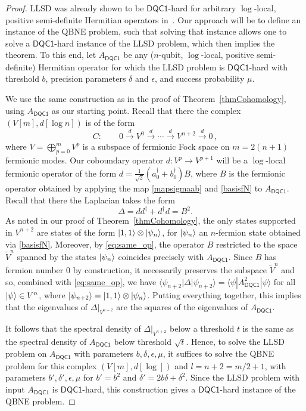 \documentclass[11pt]{article}
\numberwithin{equation}{section}
\newcommand{\DQC}{\mathsf{DQC1}}
\newcommand\equ[1] {\begin{equation}#1\end{equation}}
\renewcommand\( {\left(}
\renewcommand\) {\right)}
\renewcommand{\braket}[1]{\langle #1 \rangle}
\begin{document}
\begin{proof}
	{\sc LLSD} was already shown to be $\DQC$-hard for arbitrary $\log$-local, positive semi-definite Hermitian operators in~\cite{gyurik}. Our approach will be to define an instance of the {\sc QBNE} problem, such that solving that instance allows one to solve a $\DQC$-hard instance of the {\sc LLSD} problem, which then implies the theorem. To this end, let $A_{\DQC}$ be any ($n$-qubit, $\log$-local, positive semi-definite) Hermitian operator for which the {\sc LLSD} problem is $\DQC$-hard with threshold $b$, precision parameters $\delta$ and $\epsilon$, and success probability $\mu$. 
	
	We use the same construction as in the proof of Theorem~\ref{thmCohomology}, using $A_{\DQC}$ as our starting point. Recall that there the complex $(V[m], d[\log n])$ is of the form
	\[
	    C:\qquad 0\xrightarrow{d} V^{0}\xrightarrow{d} \cdots \xrightarrow{d} V^{n+2}\xrightarrow{d} 0\,,
	\]
	where $V = \bigoplus_{p=0}^{m} V^p$ is a subspace of fermionic Fock space on $m=2(n+1)$ fermionic modes. Our coboundary operator $d : V^p \rightarrow V^{p+1}$ will be a $\log$-local fermionic operator of the form $d = \frac{1}{\sqrt{2}}(a_0^\dagger + b_0^\dagger) B$, where $B$ is the fermionic operator obtained by applying the map \eqref{mapsigmaab} and \eqref{basisfN} to $A_{\DQC}$. Recall that there the Laplacian takes the form
	\equ{
	    \Delta = dd^\dagger + d^\dagger d = B^2.
	}
	As noted in our proof of Theorem~\ref{thmCohomology}, the only states supported in $V^{n+2}$ are states of the form $\ket{1,1}\otimes\ket{\psi_n}$, for $\ket{\psi_n}$ an $n$-fermion state obtained via \eqref{basisfN}. Moreover, by \eqref{eq:same_op}, the operator $B$ restricted to the space $\tilde{V}^n$ spanned by the states $\ket{\psi_n}$ coincides precisely with $A_{\DQC}$. 
	Since $B$ has fermion number $0$ by construction, it necessarily preserves the subspace $\tilde{V}^n$ and so, combined with \eqref{eq:same_op}, we have $\braket{\psi_{n+2} | \Delta | \psi_{n+2}} = \braket{\psi | A_{\DQC}^2 | \psi}$ for all $\ket{\psi} \in V^{n}$, where $\ket{\psi_{n+2}} = \ket{1,1}\otimes \ket{\psi_n}$. Putting everything together, this implies that the eigenvalues of $\Delta|_{V^{n+2}}$ are the squares of the eigenvalues of $A_{\DQC}$.
	
	It follows that the spectral density of $\Delta|_{V^{n+2}}$ below a threshold $t$ is the same as the spectral density of $A_{\DQC}$ below threshold $\sqrt{t}$. Hence, to solve the {\sc LLSD} problem on $A_{\DQC}$ with parameters $b,\delta,\epsilon,\mu$, it suffices to solve the {\sc QBNE} problem for this complex $(V[m],d[\log])$ and $l = n+2 = m/2+1$, with parameters $b',\delta',\epsilon,\mu$ for $b' = b^2$ and $\delta' = 2b\delta + \delta^2$. Since the {\sc LLSD} problem with input $A_{\DQC}$ is $\DQC$-hard, this construction gives a $\DQC$-hard instance of the {\sc QBNE} problem. 
	

\end{proof}
\end{document}
